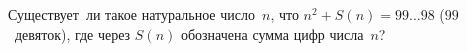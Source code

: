 \begin{problems}

\item
Существует~ли такое натуральное число~$n$, что $n^2 + S(n) = 99{\ldots}98$
($99$~девяток), где через $S(n)$ обозначена сумма цифр числа~$n$? 


%


\end{problems}
